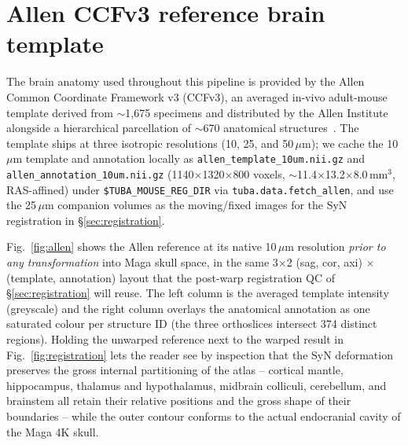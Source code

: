 \documentclass{compactarticle}
\begin{document}
\section{Allen CCFv3 reference brain template}
\label{sec:allen}

The brain anatomy used throughout this pipeline is provided by the
Allen Common Coordinate Framework v3 (CCFv3), an averaged in-vivo
adult-mouse template derived from $\sim$1{,}675 specimens and
distributed by the Allen Institute alongside a hierarchical
parcellation of $\sim$670 anatomical structures~\cite{allen-ccfv3}.
The template ships at three isotropic resolutions (10, 25, and
50\,$\mu$m); we cache the 10\,$\mu$m template and annotation locally as
\texttt{allen\_template\_10um.nii.gz} and
\texttt{allen\_annotation\_10um.nii.gz} (1140${\times}$1320${\times}$800
voxels, $\sim$11.4${\times}$13.2${\times}$8.0\,mm$^3$, RAS-affined) under
\texttt{\$TUBA\_MOUSE\_REG\_DIR} via
\texttt{tuba.data.fetch\_allen}, and use the 25\,$\mu$m
companion volumes as the moving/fixed images for the SyN registration
in \S\ref{sec:registration}.

Fig.~\ref{fig:allen} shows the Allen reference at its native
10\,$\mu$m resolution \emph{prior to any transformation} into Maga
skull space, in the same 3${\times}$2 (sag, cor, axi) ${\times}$ (template,
annotation) layout that the post-warp registration QC of
\S\ref{sec:registration} will reuse. The left column is the averaged
template intensity (greyscale) and the right column overlays the
anatomical annotation as one saturated colour per structure ID (the
three orthoslices intersect 374 distinct regions). Holding the
unwarped reference next to the warped result in
Fig.~\ref{fig:registration} lets the reader see by inspection that
the SyN deformation preserves the gross internal partitioning of the
atlas -- cortical mantle, hippocampus, thalamus and hypothalamus,
midbrain colliculi, cerebellum, and brainstem all retain their
relative positions and the gross shape of their boundaries -- while
the outer contour conforms to the actual endocranial cavity of the
Maga 4K skull.
\end{document}
